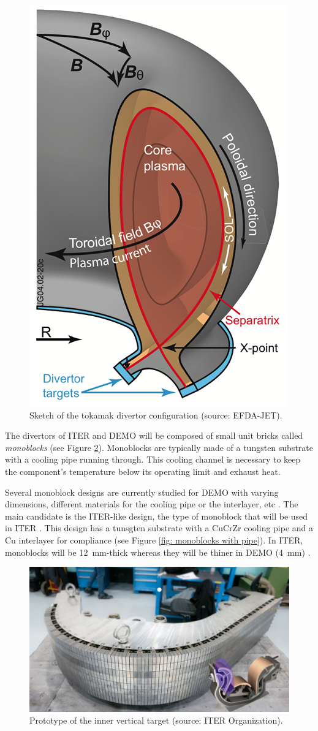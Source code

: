 \begin{figure} [h]
    \centering
    \includegraphics[width=0.5\linewidth]{Figures/Chapter1/sketch_divertor.png}
    \caption{Sketch of the tokamak divertor configuration (source: EFDA-JET).}
    \label{fig: divertor diagram}
\end{figure}


The divertors of ITER and DEMO will be composed of small unit bricks called \textit{monoblocks} (see Figure \ref{fig: inner target photo}).
Monoblocks are typically made of a tungsten substrate with a cooling pipe running through.
This cooling channel is necessary to keep the component's temperature below its operating limit and exhaust heat.

Several monoblock designs are currently studied for DEMO with varying dimensions, different materials for the cooling pipe or the interlayer, etc .
The main candidate is the ITER-like design, the type of monoblock that will be used in ITER \cite{hirai_use_2016}.
This design has a tunsgten substrate with a CuCrZr cooling pipe and a Cu interlayer for compliance (see Figure \ref{fig: monoblocks with pipe}).
In ITER, monoblocks will be \SI{12}{mm}-thick whereas they will be thiner in DEMO (\SI{4}{mm}) .

\begin{figure} [h]
    \centering
    \includegraphics[width=0.8\linewidth]{Figures/Chapter1/inner_target_iter.jpg}
    \caption{Prototype of the inner vertical target (source: ITER Organization).}
    \label{fig: inner target photo}
\end{figure}

